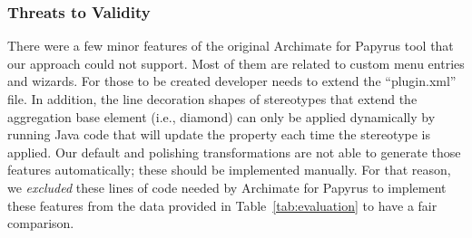 \subsubsection{Threats to Validity}
There were a few minor features of the original Archimate for Papyrus tool that our approach could not support. 
Most of them are related to custom menu entries and wizards. For those to be created developer needs to extend the ``plugin.xml'' file. 
In addition, the line decoration shapes of stereotypes that extend the aggregation base element (i.e., diamond) can only be applied dynamically by running Java code that will update the property each time the stereotype is applied. 
Our default and polishing transformations are not able to generate those features automatically; these should be implemented manually. 
For that reason, we \textit{excluded} these lines of code needed by Archimate for Papyrus to implement these features from the data provided in Table~\ref{tab:evaluation} to have a fair comparison. 

